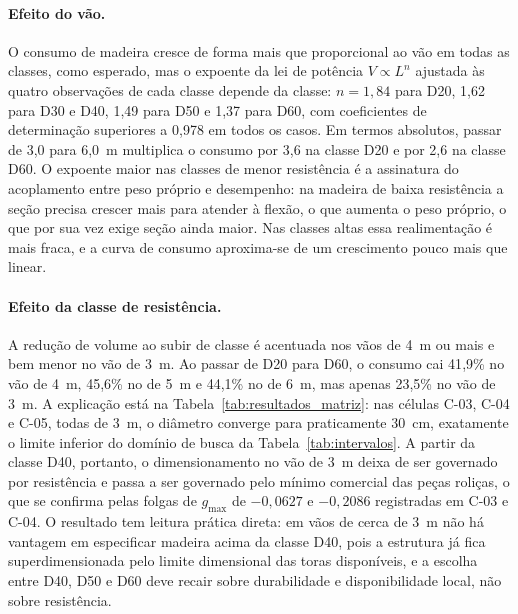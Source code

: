 \paragraph{Efeito do vão.} O consumo de madeira cresce de forma mais que proporcional ao vão em todas as classes, como esperado, mas o expoente da lei de potência $V \propto L^{n}$ ajustada às quatro observações de cada classe depende da classe: $n = 1{,}84$ para D20, 1{,}62 para D30 e D40, 1{,}49 para D50 e 1{,}37 para D60, com coeficientes de determinação superiores a 0{,}978 em todos os casos.
Em termos absolutos, passar de 3{,}0 para 6{,}0~m multiplica o consumo por 3{,}6 na classe D20 e por 2{,}6 na classe D60.
O expoente maior nas classes de menor resistência é a assinatura do acoplamento entre peso próprio e desempenho: na madeira de baixa resistência a seção precisa crescer mais para atender à flexão, o que aumenta o peso próprio, o que por sua vez exige seção ainda maior.
Nas classes altas essa realimentação é mais fraca, e a curva de consumo aproxima-se de um crescimento pouco mais que linear.

\paragraph{Efeito da classe de resistência.} A redução de volume ao subir de classe é acentuada nos vãos de 4~m ou mais e bem menor no vão de 3~m.
Ao passar de D20 para D60, o consumo cai 41{,}9\% no vão de 4~m, 45{,}6\% no de 5~m e 44{,}1\% no de 6~m, mas apenas 23{,}5\% no vão de 3~m.
A explicação está na Tabela~\ref{tab:resultados_matriz}: nas células C-03, C-04 e C-05, todas de 3~m, o diâmetro converge para praticamente 30~cm, exatamente o limite inferior do domínio de busca da Tabela~\ref{tab:intervalos}.
A partir da classe D40, portanto, o dimensionamento no vão de 3~m deixa de ser governado por resistência e passa a ser governado pelo mínimo comercial das peças roliças, o que se confirma pelas folgas de $g_{\max}$ de $-0{,}0627$ e $-0{,}2086$ registradas em C-03 e C-04.
O resultado tem leitura prática direta: em vãos de cerca de 3~m não há vantagem em especificar madeira acima da classe D40, pois a estrutura já fica superdimensionada pelo limite dimensional das toras disponíveis, e a escolha entre D40, D50 e D60 deve recair sobre durabilidade e disponibilidade local, não sobre resistência.

